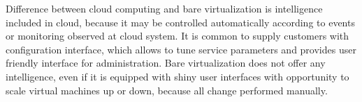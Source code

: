 Difference between cloud computing and bare virtualization is intelligence included in cloud, because it may be controlled automatically according to events or monitoring observed at cloud system. It is common to supply customers with configuration interface, which allows to tune service parameters and provides user friendly interface for administration.
Bare virtualization does not offer any intelligence, even if it is equipped with shiny user interfaces with opportunity to scale virtual machines up or down, because all change performed manually.




